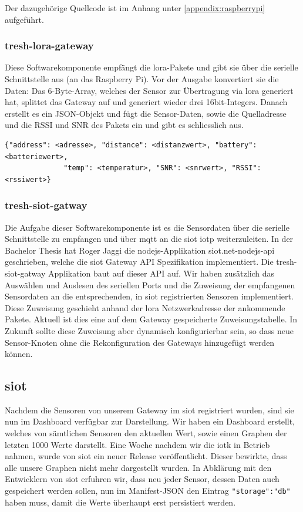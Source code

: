 Der dazugehörige Quellcode ist im Anhang unter \ref{appendix:raspberrypi} aufgeführt.

\subsubsection*{tresh-lora-gateway}

Diese Softwarekomponente empfängt die \gls{lora}-Pakete und gibt sie über die serielle Schnittstelle aus (an das Raspberry Pi). Vor der Ausgabe konvertiert sie die Daten: Das 6-Byte-Array, welches der Sensor zur Übertragung via \gls{lora} generiert hat, splittet das Gateway auf und generiert wieder drei 16bit-Integers. Danach erstellt es ein JSON-Objekt und fügt die Sensor-Daten, sowie die Quelladresse und die RSSI und SNR des Pakets ein und gibt es schliesslich aus.

\begin{lstlisting}[caption=Struktur des JSON-Objekts,numbers=none]
        {"address": <adresse>, "distance": <distanzwert>, "battery": <batteriewert>,
              "temp": <temperatur>, "SNR": <snrwert>, "RSSI": <rssiwert>}
\end{lstlisting}

\subsubsection*{tresh-siot-gatway}
Die Aufgabe dieser Softwarekomponente ist es die Sensordaten über die serielle Schnittstelle zu empfangen und über \gls{mqtt} an die \gls{siot} \gls{iotp} weiterzuleiten. In der Bachelor Thesis \autocite{bfh:optimizedDataTransmission} hat Roger Jaggi die \gls{nodejs}-Applikation siot.net-nodejs-api\autocite{bfh:siot.net-nodejs-api} geschrieben, welche die \gls{siot} Gateway API Spezifikation implementiert. Die tresh-siot-gatway Applikation baut auf dieser API auf. Wir haben zusätzlich das Auswählen und Auslesen des seriellen Ports und die Zuweisung der empfangenen Sensordaten an die entsprechenden, in \gls{siot} registrierten Sensoren implementiert. Diese Zuweisung geschieht anhand der \gls{lora} Netzwerkadresse der ankommende Pakete. Aktuell ist dies eine auf dem Gateway gespeicherte Zuweisungstabelle. In Zukunft sollte diese Zuweisung aber dynamisch konfigurierbar sein, so dass neue Sensor-Knoten ohne die Rekonfiguration des Gateways hinzugefügt werden können.

\subsection{\gls{siot}}
Nachdem die Sensoren von unserem Gateway im \gls{siot} registriert wurden, sind sie nun im Dashboard verfügbar zur Darstellung. Wir haben ein Dashboard erstellt, welches von sämtlichen Sensoren den aktuellen Wert, sowie einen Graphen der letzten 1000 Werte darstellt. Eine Woche nachdem wir die \gls{iotk} in Betrieb nahmen, wurde von \gls{siot} ein neuer Release veröffentlicht. Dieser bewirkte, dass alle unsere Graphen nicht mehr dargestellt wurden. In Abklärung mit den Entwicklern von \gls{siot} erfuhren wir, dass neu jeder Sensor, dessen Daten auch gespeichert werden sollen, nun im Manifest-JSON den Eintrag \verb|"storage":"db"| haben muss, damit die Werte überhaupt erst persistiert werden.

